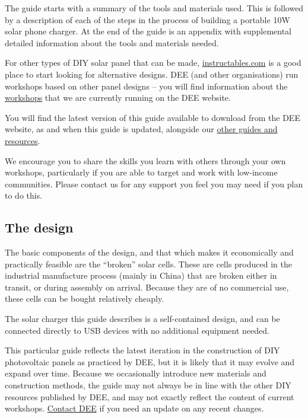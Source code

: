\documentclass{article}
\theoremstyle{definition}
\theoremstyle{definition}
\theoremstyle{remark}
\begin{document}
    The guide starts with a summary of the tools and materials used. This is followed by a description of each of the steps in the process of building a portable 10W solar phone charger. At the end of the guide is an appendix with supplemental detailed information about the tools and materials needed. 

    For other types of DIY solar panel that can be made, \href{https://www.instructables.com/}{instructables.com} is a good place to start looking for alternative designs. DEE (and other organisations) run workshops based on other panel designs – you will find information about the \href{https://www.demandenergyequality.org/our-workshops/}{workshops} that we are currently running on the DEE website. 

    You will find the latest version of this guide available to download from the DEE website, as and when this guide is updated, alongside our \href{https://www.demandenergyequality.org/resources/}{other guides and resources}. 

    We encourage you to share the skills you learn with others through your own workshops, particularly if you are able to target and work with low-income communities. Please contact us for any support you feel you may need if you plan to do this.


  \subsection{The design} %
  \label{ssub:the_design}

    The basic components of the design, and that which makes it economically and practically feasible are the “broken” solar cells. These are cells produced in the industrial manufacture process (mainly in China) that are broken either in transit, or during assembly on arrival. Because they are of no commercial use, these cells can be bought relatively cheaply.

    The solar charger this guide describes is a self-contained design, and can be connected directly to USB devices with no additional equipment needed. 

    This particular guide reflects the latest iteration in the construction of DIY photovoltaic panels as practiced by DEE, but it is likely that it may evolve and expand over time. Because we occasionally introduce new materials and construction methods, the guide may not always be in line with the other DIY resources published by DEE, and may not exactly reflect the content of current workshops. \href{https://www.demandenergyequality.org/contact-us}{Contact DEE} if you need an update on any recent changes. 
  
\end{document}
